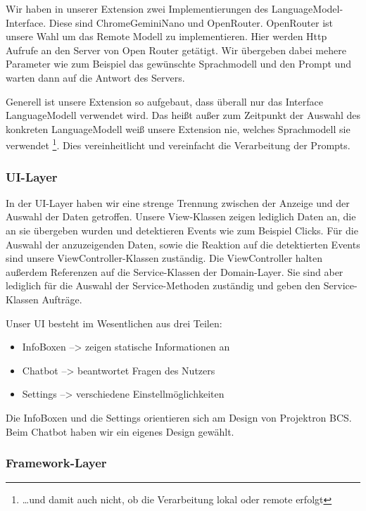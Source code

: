   Wir haben in unserer Extension zwei Implementierungen des LanguageModel-Interface. Diese sind ChromeGeminiNano und OpenRouter. OpenRouter ist unsere Wahl um das Remote Modell zu implementieren. Hier werden Http Aufrufe an den Server von Open Router getätigt. Wir übergeben dabei mehere Parameter wie zum Beispiel das gewünschte Sprachmodell und den Prompt und warten dann auf die Antwort des Servers.

  Generell ist unsere Extension so aufgebaut, dass überall nur das Interface LanguageModell verwendet wird. Das heißt außer zum Zeitpunkt der Auswahl des konkreten LanguageModell weiß unsere Extension nie, welches Sprachmodell sie verwendet \footnote{\dots und damit auch nicht, ob die Verarbeitung lokal oder remote erfolgt}. Dies vereinheitlicht und vereinfacht die Verarbeitung der Prompts.

  \subsubsection{UI-Layer}

  In der UI-Layer haben wir eine strenge Trennung zwischen der Anzeige und der Auswahl der Daten getroffen. Unsere View-Klassen zeigen lediglich Daten an, die an sie übergeben wurden und detektieren Events wie zum Beispiel Clicks. Für die Auswahl der anzuzeigenden Daten, sowie die Reaktion auf die detektierten Events sind unsere ViewController-Klassen zuständig. Die ViewController halten außerdem Referenzen auf die Service-Klassen der Domain-Layer. Sie sind  aber lediglich für die Auswahl der Service-Methoden zuständig und geben den Service-Klassen Aufträge.

  Unser UI besteht im Wesentlichen aus drei Teilen:
  \begin{itemize}
    \item InfoBoxen --> zeigen statische Informationen an
    \item Chatbot --> beantwortet Fragen des Nutzers
    \item Settings --> verschiedene Einstellmöglichkeiten
  \end{itemize}

  Die InfoBoxen und die Settings orientieren sich am Design von Projektron BCS. Beim Chatbot haben wir ein eigenes Design gewählt.

  \subsubsection{Framework-Layer}

